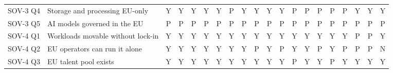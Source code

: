 \begin{table}[p]
\begin{tabular}{@{}l l *{18}{c}@{}}
SOV-3 Q4 & Storage and processing EU-only & \cellcolor{green!22}Y & \cellcolor{green!22}Y & \cellcolor{green!22}Y & \cellcolor{green!22}Y & \cellcolor{green!22}Y & \cellcolor{orange!25}P & \cellcolor{green!22}Y & \cellcolor{green!22}Y & \cellcolor{green!22}Y & \cellcolor{green!22}Y & \cellcolor{orange!25}P & \cellcolor{orange!25}P & \cellcolor{orange!25}P & \cellcolor{orange!25}P & \cellcolor{orange!25}P & \cellcolor{green!22}Y & \cellcolor{green!22}Y & \cellcolor{green!22}Y \\
SOV-3 Q5 & AI models governed in the EU & \cellcolor{orange!25}P & \cellcolor{orange!25}P & \cellcolor{orange!25}P & \cellcolor{orange!25}P & \cellcolor{orange!25}P & \cellcolor{orange!25}P & \cellcolor{orange!25}P & \cellcolor{orange!25}P & \cellcolor{orange!25}P & \cellcolor{orange!25}P & \cellcolor{orange!25}P & \cellcolor{orange!25}P & \cellcolor{orange!25}P & \cellcolor{orange!25}P & \cellcolor{orange!25}P & \cellcolor{orange!25}P & \cellcolor{orange!25}P & \cellcolor{orange!25}P \\
\midrule
SOV-4 Q1 & Workloads movable without lock-in & \cellcolor{green!22}Y & \cellcolor{green!22}Y & \cellcolor{green!22}Y & \cellcolor{green!22}Y & \cellcolor{green!22}Y & \cellcolor{green!22}Y & \cellcolor{green!22}Y & \cellcolor{green!22}Y & \cellcolor{green!22}Y & \cellcolor{green!22}Y & \cellcolor{green!22}Y & \cellcolor{green!22}Y & \cellcolor{green!22}Y & \cellcolor{green!22}Y & \cellcolor{green!22}Y & \cellcolor{orange!25}P & \cellcolor{orange!25}P & \cellcolor{green!22}Y \\
SOV-4 Q2 & EU operators can run it alone & \cellcolor{green!22}Y & \cellcolor{green!22}Y & \cellcolor{green!22}Y & \cellcolor{green!22}Y & \cellcolor{green!22}Y & \cellcolor{green!22}Y & \cellcolor{green!22}Y & \cellcolor{orange!25}P & \cellcolor{green!22}Y & \cellcolor{orange!25}P & \cellcolor{green!22}Y & \cellcolor{green!22}Y & \cellcolor{orange!25}P & \cellcolor{green!22}Y & \cellcolor{orange!25}P & \cellcolor{orange!25}P & \cellcolor{orange!25}P & \cellcolor{red!25}N \\
SOV-4 Q3 & EU talent pool exists & \cellcolor{green!22}Y & \cellcolor{green!22}Y & \cellcolor{green!22}Y & \cellcolor{green!22}Y & \cellcolor{green!22}Y & \cellcolor{green!22}Y & \cellcolor{green!22}Y & \cellcolor{green!22}Y & \cellcolor{green!22}Y & \cellcolor{green!22}Y & \cellcolor{orange!25}P & \cellcolor{green!22}Y & \cellcolor{green!22}Y & \cellcolor{orange!25}P & \cellcolor{green!22}Y & \cellcolor{green!22}Y & \cellcolor{green!22}Y & \cellcolor{green!22}Y \\

\end{tabular}
\end{table}
